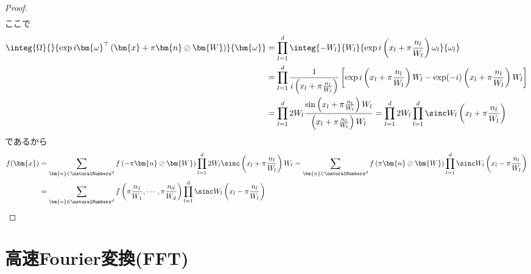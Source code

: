 \begin{proof}
\begin{align*}
				\end{align*}
				ここで
				\begin{align*}
					\integ{\Omega}{}{\exp i \bm{\omega}^\top\left(\bm{x} + \pi\bm{n}\oslash\bm{W}\right) }{\bm{\omega}} &= \prod_{l=1}^d \integ{-W_l}{W_l}{\exp i\left(x_l + \pi\frac{n_l}{W_l}\right)\omega_l}{\omega_l} \\
					&= \prod_{l=1}^d \frac{1}{i\left(x_l + \pi\frac{n_l}{W_l}\right)}\left[\exp i\left(x_l + \pi\frac{n_l}{W_l}\right)W_l - \exp (-i)\left(x_l + \pi\frac{n_l}{W_l}\right)W_l\right] \\
					&= \prod_{l=1}^d 2W_l \frac{\sin \left(x_l + \pi\frac{n_l}{W_l}\right)W_l}{\left(x_l + \pi\frac{n_l}{W_l}\right)W_l} = \prod_{l=1}^d 2W_l \prod_{l=1}^d \sinc W_l\left(x_l + \pi\frac{n_l}{W_l}\right)
				\end{align*}
				であるから
				\begin{align*}
					f(\bm{x}) &= \sum_{\bm{n}\in\naturalNumbers^d} f\left(-\pi\bm{n}\oslash\bm{W}\right) \prod_{l=1}^d 2W_l \sinc \left(x_l + \pi\frac{n_l}{W_l}\right)W_l = \sum_{\bm{n}\in\naturalNumbers^d} f\left(\pi\bm{n}\oslash\bm{W}\right) \prod_{l=1}^d \sinc W_l\left(x_l - \pi\frac{n_l}{W_l}\right) \\
					&= \sum_{\bm{n}\in\naturalNumbers^d} f\left(\pi\frac{n_1}{W_1},\cdots,\pi\frac{n_d}{W_d}\right) \prod_{l=1}^d \sinc W_l\left(x_l - \pi\frac{n_l}{W_l}\right)
				\end{align*}
			\end{proof}
		\chapter{高速Fourier変換(FFT)}
